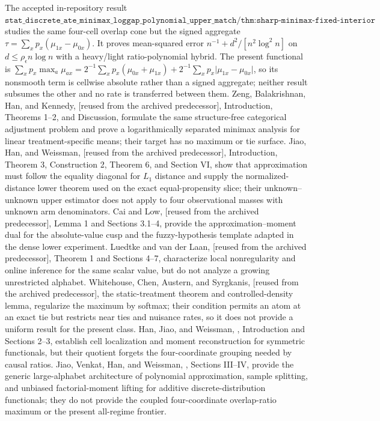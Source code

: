 \documentclass{article}
\begin{document}
The accepted in-repository result \(\texttt{stat\_discrete\_ate\_minimax\_loggap\_polynomial\_upper\_match}/\texttt{thm:sharp-minimax-fixed-interior}\) studies the same four-cell overlap cone but the signed aggregate \(\tau=\sum_xp_x(\mu_{1x}-\mu_{0x})\). It proves mean-squared error \(n^{-1}+d^2/[n^2\log^2 n]\) on \(d\leq\rho_\epsilon n\log n\) with a heavy/light ratio-polynomial hybrid. The present functional is \(\sum_xp_x\max_a\mu_{ax}=2^{-1}\sum_xp_x(\mu_{0x}+\mu_{1x})+2^{-1}\sum_xp_x\lvert\mu_{1x}-\mu_{0x}\rvert\), so its nonsmooth term is cellwise absolute rather than a signed aggregate; neither result subsumes the other and no rate is transferred between them. Zeng, Balakrishnan, Han, and Kennedy, \cite{ZengBalakrishnanHanKennedy2024Discrete} [reused from the archived predecessor], Introduction, Theorems 1--2, and Discussion, formulate the same structure-free categorical adjustment problem and prove a logarithmically separated minimax analysis for linear treatment-specific means; their target has no maximum or tie surface. Jiao, Han, and Weissman, \cite{JiaoHanWeissman2018L1} [reused from the archived predecessor], Introduction, Theorem 3, Construction 2, Theorem 6, and Section VI, show that approximation must follow the equality diagonal for \(L_1\) distance and supply the normalized-distance lower theorem used on the exact equal-propensity slice; their unknown--unknown upper estimator does not apply to four observational masses with unknown arm denominators. Cai and Low, \cite{CaiLow2011L1} [reused from the archived predecessor], Lemma 1 and Sections 3.1--4, provide the approximation--moment dual for the absolute-value cusp and the fuzzy-hypothesis template adapted in the dense lower experiment. Luedtke and van der Laan, \cite{LuedtkeVanderLaan2016OptimalValue} [reused from the archived predecessor], Theorem 1 and Sections 4--7, characterize local nonregularity and online inference for the same scalar value, but do not analyze a growing unrestricted alphabet. Whitehouse, Chen, Austern, and Syrgkanis, \cite{WhitehouseChenAusternSyrgkanis2025} [reused from the archived predecessor], the static-treatment theorem and controlled-density lemma, regularize the maximum by softmax; their condition permits an atom at an exact tie but restricts near ties and nuisance rates, so it does not provide a uniform result for the present class. Han, Jiao, and Weissman, \cite{HanJiaoWeissman2018Local}, Introduction and Sections 2--3, establish cell localization and moment reconstruction for symmetric functionals, but their quotient forgets the four-coordinate grouping needed by causal ratios. Jiao, Venkat, Han, and Weissman, \cite{JiaoVenkatHanWeissman2015Functionals}, Sections III--IV, provide the generic large-alphabet architecture of polynomial approximation, sample splitting, and unbiased factorial-moment lifting for additive discrete-distribution functionals; they do not provide the coupled four-coordinate overlap-ratio maximum or the present all-regime frontier.
\end{document}
